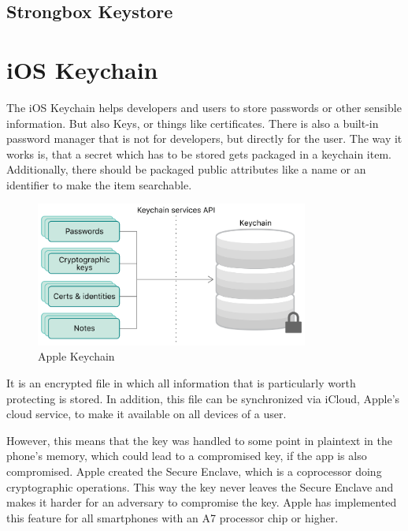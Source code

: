 \documentclass[12pt,oneside,a4paper,parskip]{scrbook}
\begin{document}
\subsection{Strongbox Keystore}



\section{iOS Keychain}

The iOS Keychain helps developers and users to store passwords or other sensible information. But also Keys, or things like certificates. There is also a built-in password manager that is not for developers, but directly for the user. The way it works is, that a secret which has to be stored gets packaged in a keychain item. Additionally, there should be packaged public attributes like a name or an identifier to make the item searchable. 

\begin{figure}[ht]
  \centering
  \includegraphics[width=0.8\textwidth]{ressources/apple_keychain.png}
  \caption{Apple Keychain \parencite{apple_keychain_2020}}
  \label{apple:keychain}
\end{figure}

It is an encrypted file in which all information that is particularly worth protecting is stored. In addition, this file can be synchronized via iCloud, Apple's cloud service, to make it available on all devices of a user.

However, this means that the key was handled to some point in plaintext in the phone's memory, which could lead to a compromised key, if the app is also compromised. Apple created the Secure Enclave, which is a coprocessor doing cryptographic operations. This way the key never leaves the Secure Enclave and makes it harder for an adversary to compromise the key.
Apple has implemented this feature for all smartphones with an A7 processor chip or higher.
\parencite{apple_storing_2020} \parencite{apple_keychain_2020}
\end{document}

